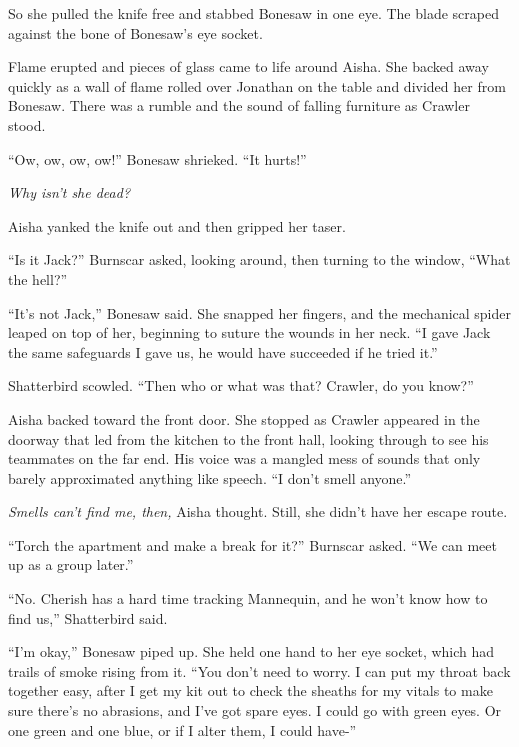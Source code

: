 So she pulled the knife free and stabbed Bonesaw in one eye.  The blade scraped against the bone of Bonesaw's eye socket.



Flame erupted and pieces of glass came to life around Aisha.  She backed away quickly as a wall of flame rolled over Jonathan on the table and divided her from Bonesaw.  There was a rumble and the sound of falling furniture as Crawler stood.



``Ow, ow, ow, ow!''  Bonesaw shrieked.  ``It hurts!''



\emph{Why isn't she dead?}



Aisha yanked the knife out and then gripped her taser.



``Is it Jack?'' Burnscar asked, looking around, then turning to the window, ``What the hell?''



``It's not Jack,'' Bonesaw said.  She snapped her fingers, and the mechanical spider leaped on top of her, beginning to suture the wounds in her neck.  ``I gave Jack the same safeguards I gave us, he would have succeeded if he tried it.''



Shatterbird scowled.  ``Then who or what was that?  Crawler, do you know?''



Aisha backed toward the front door.  She stopped as Crawler appeared in the doorway that led from the kitchen to the front hall, looking through to see his teammates on the far end.  His voice was a mangled mess of sounds that only barely approximated anything like speech.  ``I don't smell anyone.''



\emph{Smells can't find me, then, }Aisha thought.  Still, she didn't have her escape route.



``Torch the apartment and make a break for it?'' Burnscar asked.  ``We can meet up as a group later.''



``No.  Cherish has a hard time tracking Mannequin, and he won't know how to find us,'' Shatterbird said.



``I'm okay,'' Bonesaw piped up.  She held one hand to her eye socket, which had trails of smoke rising from it.  ``You don't need to worry.  I can put my throat back together easy, after I get my kit out to check the sheaths for my vitals to make sure there's no abrasions, and I've got spare eyes.  I could go with green eyes.  Or one green and one blue, or if I alter them, I could have-''



